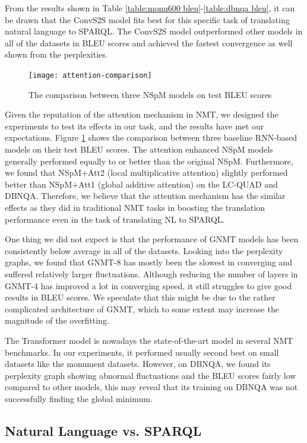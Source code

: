 From the results shown in Table \ref{table:monu600 bleu}-\ref{table:dbnqa bleu}, it can be drawn that the ConvS2S model fits best for this specific task of translating natural language to SPARQL. The ConvS2S model outperformed other models in all of the datasets in BLEU scores and achieved the fastest convergence as well shown from the perplexities. 

\begin{figure}[H]
\texttt{[image: attention-comparison]}
\centering
\caption{The comparison between three NSpM models on test BLEU scores}
\label{fig:attention comparison}
\end{figure}

Given the reputation of the attention mechanism in NMT, we designed the experiments to test its effects in our task, and the results have met our expectations. Figure \ref{fig:attention comparison} shows the comparison between three baseline RNN-based models on their test BLEU scores. The attention enhanced NSpM models generally performed equally to or better than the original NSpM. Furthermore, we found that NSpM+Att2 (local multiplicative attention) slightly performed better than NSpM+Att1 (global additive attention) on the LC-QUAD and DBNQA. Therefore, we believe that the attention mechanism has the similar effects as they did in traditional NMT tasks in boosting the translation performance even in the task of translating NL to SPARQL.

One thing we did not expect is that the performance of GNMT models has been consistently below average in all of the datasets. Looking into the perplexity graphs, we found that GNMT-8 has mostly been the slowest in converging and suffered relatively larger fluctuations. Although reducing the number of layers in GNMT-4 has improved a lot in converging speed, it still struggles to give good results in BLEU scores. We speculate that this might be due to the rather complicated architecture of GNMT, which to some extent may increase the magnitude of the overfitting. 

The Transformer model is nowadays the state-of-the-art model in several NMT benchmarks. In our experiments, it performed usually second best on small datasets like the monument datasets. However, on DBNQA, we found its perplexity graph showing abnormal fluctuations and the BLEU scores fairly low compared to other models, this may reveal that its training on DBNQA was not successfully finding the global minimum.

\subsection{Natural Language vs. SPARQL}

